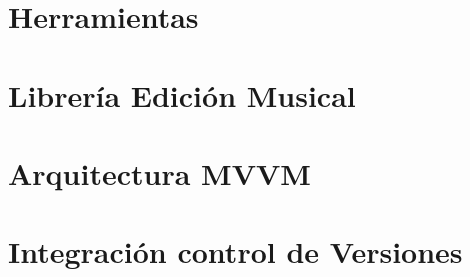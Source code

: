 \section{Herramientas}
\section{Librería Edición Musical}
\section{Arquitectura MVVM}
\section{Integración control de Versiones}
